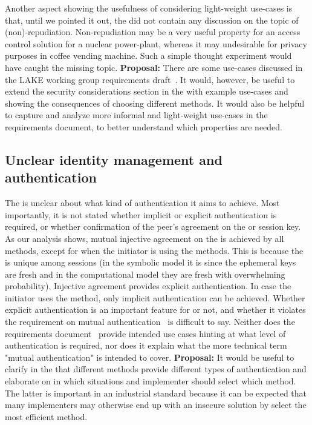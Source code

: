 \documentclass[runningheads,draft,x11names]{llncs}
\begin{document}
Another aspect showing the usefulness of considering \mEdhoc{} light-weight
use-cases is that, until we pointed it out, the \mSpec{} did not contain
any discussion on the topic of (non)-repudiation.
%
Non-repudiation may be a very useful property for an access control
solution for a nuclear power-plant, whereas it may undesirable for privacy
purposes in coffee vending machine.
%
Such a simple thought experiment would have caught the missing topic.
%
\textbf{Proposal:} There are some use-cases discussed in the LAKE working
group requirements draft~\cite{ietf-lake-reqs-04}.
%
It would, however, be useful to extend the security considerations section in
the \mSpec{} with example use-cases and showing the consequences of
choosing different methods.
%
It would also be helpful to capture and analyze more informal and light-weight
use-cases in the requirements document, to better understand which properties
are needed.

\subsection{Unclear identity management and authentication}
\label{sec:usableSecurity}
%
The \mSpec{} is unclear about what kind of authentication it aims to achieve.
%
Most importantly, it is not stated whether implicit or explicit authentication
is required, or whether confirmation of the peer's agreement on the \mSid{} or
session key. 
%
As our analysis shows, mutual injective agreement on the \mSid{} is achieved
by all methods, except for when the initiator is using the \mStat{} methods.
%
This is because the \mSid{} is unique among sessions (in the symbolic model it
is since the ephemeral keys are fresh and in the computational model they are
fresh with overwhelming probability). 
%
Injective agreement provides explicit authentication.
%
In case the initiator uses the \mStat{} method, only implicit authentication
can be achieved.
%
Whether explicit authentication is an important feature for \mEdhoc{} or not, and
whether it violates the requirement on mutual
authentication~\cite{ietf-lake-reqs-04} is difficult to say.
%
Neither does the requirements document~\cite{ietf-lake-reqs-04} provide
intended use cases hinting at what level of authentication is required, nor does
it explain what the more technical term "mutual authentication"
is intended to cover.
%
\textbf{Proposal:}
It would be useful to clarify in the \mSpec{} that different methods provide
different types of authentication and elaborate on in which situations and
implementer should select which method.
%
The latter is important in an industrial standard because it can be expected
that many implementers may otherwise end up with an insecure solution
by select the most efficient method. 
%
\end{document}

